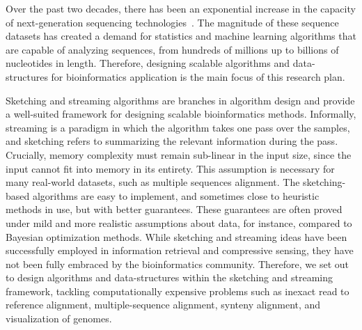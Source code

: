 Over the past two decades, there has been an exponential increase in the capacity of next-generation sequencing technologies~\cite{stephens2015big}. The magnitude of these sequence datasets has created a demand for statistics and machine learning algorithms that are capable of analyzing sequences, from hundreds of millions up to billions of nucleotides in length. Therefore, designing scalable algorithms and data-structures for bioinformatics application is the main focus of this research plan. 

Sketching and streaming algorithms are branches in algorithm design and provide a well-suited framework for designing scalable bioinformatics methods. Informally, streaming is a paradigm in which the algorithm takes one pass over the samples, and sketching refers to summarizing the relevant information during the pass. Crucially, memory complexity must remain sub-linear in the input size, since the input cannot fit into memory in its entirety. This assumption is necessary for many real-world datasets, such as multiple sequences alignment. The sketching-based algorithms are easy to implement, and sometimes close to heuristic methods in use, but with better guarantees. These guarantees are often proved under mild and more realistic assumptions about data, for instance, compared to Bayesian optimization methods. While sketching and streaming ideas have been successfully employed in information retrieval and compressive sensing, they have not been fully embraced by the bioinformatics community. Therefore, we set out to design algorithms and data-structures within the sketching and streaming framework, tackling computationally expensive problems such as inexact read to reference alignment, multiple-sequence alignment, synteny alignment, and visualization of genomes.